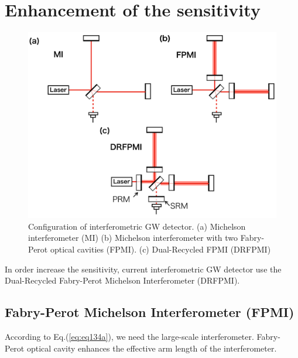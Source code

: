 \section{Enhancement of the sensitivity} \label{sec:13}
\begin{figure}[h]
  \begin{center}   
    \includegraphics[width=14cm]{./img_chap1/img133.png}
    \caption{Configuration of interferometric GW detector. (a) Michelson interferometer (MI) (b) Michelson interferometer with two Fabry-Perot optical cavities (FPMI). (c) Dual-Recycled FPMI (DRFPMI)} \label{img:img133}
  \end{center}
\end{figure}
In order increase the sensitivity, current interferometric GW detector use the Dual-Recycled Fabry-Perot Michelson Interferometer (DRFPMI). 


\subsection{Fabry-Perot Michelson Interferometer (FPMI)}
According to Eq.(\ref{eq:eq134a}), we need the large-scale interferometer. Fabry-Perot optical cavity enhances the effective arm length of the interferometer.


